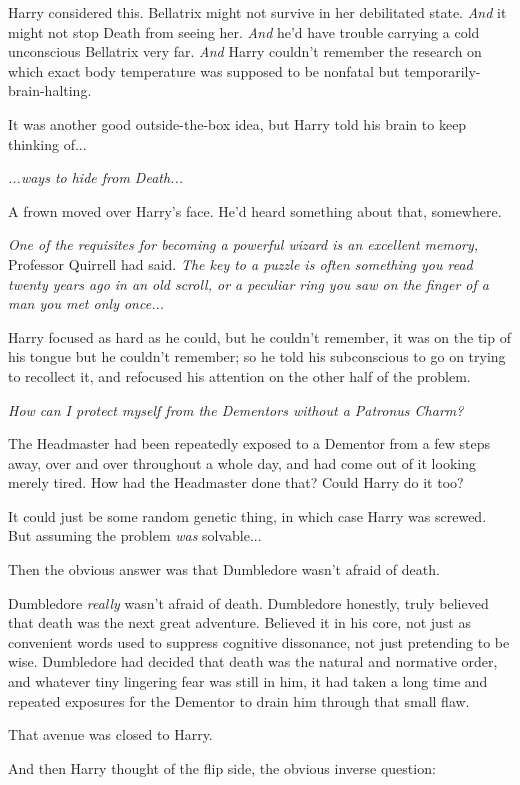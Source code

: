 Harry considered this. Bellatrix might not survive in her debilitated state. \emph{And} it might not stop Death from seeing her. \emph{And} he'd have trouble carrying a cold unconscious Bellatrix very far. \emph{And} Harry couldn't remember the research on which exact body temperature was supposed to be nonfatal but temporarily-brain-halting.

It was another good outside-the-box idea, but Harry told his brain to keep thinking of...

\emph{...ways to hide from Death...}

A frown moved over Harry's face. He'd heard something about that, somewhere.

\emph{One of the requisites for becoming a powerful wizard is an excellent memory,} Professor Quirrell had said. \emph{The key to a puzzle is often something you read twenty years ago in an old scroll, or a peculiar ring you saw on the finger of a man you met only once...}

Harry focused as hard as he could, but he couldn't remember, it was on the tip of his tongue but he couldn't remember; so he told his subconscious to go on trying to recollect it, and refocused his attention on the other half of the problem.

\emph{How can I protect myself from the Dementors without a Patronus Charm?}

The Headmaster had been repeatedly exposed to a Dementor from a few steps away, over and over throughout a whole day, and had come out of it looking merely tired. How had the Headmaster done that? Could Harry do it too?

It could just be some random genetic thing, in which case Harry was screwed. But assuming the problem \emph{was} solvable...

Then the obvious answer was that Dumbledore wasn't afraid of death.

Dumbledore \emph{really} wasn't afraid of death. Dumbledore honestly, truly believed that death was the next great adventure. Believed it in his core, not just as convenient words used to suppress cognitive dissonance, not just pretending to be wise. Dumbledore had decided that death was the natural and normative order, and whatever tiny lingering fear was still in him, it had taken a long time and repeated exposures for the Dementor to drain him through that small flaw.

That avenue was closed to Harry.

And then Harry thought of the flip side, the obvious inverse question:

